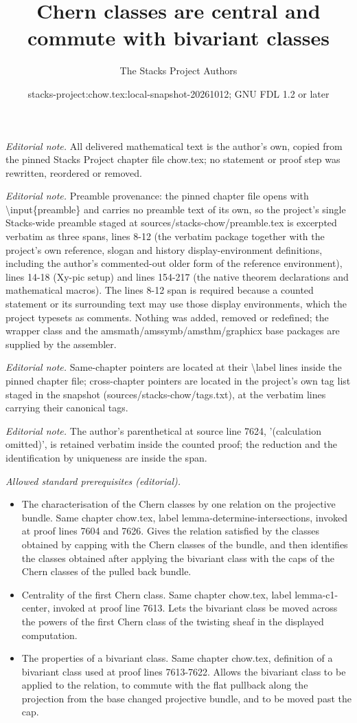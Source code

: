 \documentclass[10pt,a4paper]{amsart}
\title{Chern classes are central and commute with bivariant classes}
\author{The Stacks Project Authors}
\date{stacks-project:chow.tex:local-snapshot-20261012; GNU FDL 1.2 or later}
\theoremstyle{plain}
\theoremstyle{definition}
\theoremstyle{remark}
\numberwithin{equation}{subsection}
\begin{document}
\maketitle
\noindent\textit{Editorial note.} All delivered mathematical text is the author's own, copied from the pinned Stacks Project chapter file chow.tex; no statement or proof step was rewritten, reordered or removed.\par\medskip
\noindent\textit{Editorial note.} Preamble provenance: the pinned chapter file opens with \textbackslash{}input\{preamble\} and carries no preamble text of its own, so the project's single Stacks-wide preamble staged at sources/stacks-chow/preamble.tex is excerpted verbatim as three spans, lines 8-12 (the verbatim package together with the project's own reference, slogan and history display-environment definitions, including the author's commented-out older form of the reference environment), lines 14-18 (Xy-pic setup) and lines 154-217 (the native theorem declarations and mathematical macros). The lines 8-12 span is required because a counted statement or its surrounding text may use those display environments, which the project typesets as comments. Nothing was added, removed or redefined; the wrapper class and the amsmath/amssymb/amsthm/graphicx base packages are supplied by the assembler.\par\medskip
\noindent\textit{Editorial note.} Same-chapter pointers are located at their \textbackslash{}label lines inside the pinned chapter file; cross-chapter pointers are located in the project's own tag list staged in the snapshot (sources/stacks-chow/tags.txt), at the verbatim lines carrying their canonical tags.\par\medskip
\noindent\textit{Editorial note.} The author's parenthetical at source line 7624, '(calculation omitted)', is retained verbatim inside the counted proof; the reduction and the identification by uniqueness are inside the span.\par\medskip
\noindent\textit{Allowed standard prerequisites (editorial).}\begin{itemize}
\item The characterisation of the Chern classes by one relation on the projective bundle. Same chapter chow.tex, label lemma-determine-intersections, invoked at proof lines 7604 and 7626. Gives the relation satisfied by the classes obtained by capping with the Chern classes of the bundle, and then identifies the classes obtained after applying the bivariant class with the caps of the Chern classes of the pulled back bundle.
\item Centrality of the first Chern class. Same chapter chow.tex, label lemma-c1-center, invoked at proof line 7613. Lets the bivariant class be moved across the powers of the first Chern class of the twisting sheaf in the displayed computation.
\item The properties of a bivariant class. Same chapter chow.tex, definition of a bivariant class used at proof lines 7613-7622. Allows the bivariant class to be applied to the relation, to commute with the flat pullback along the projection from the base changed projective bundle, and to be moved past the cap.
\end{itemize}\medskip
\end{document}
